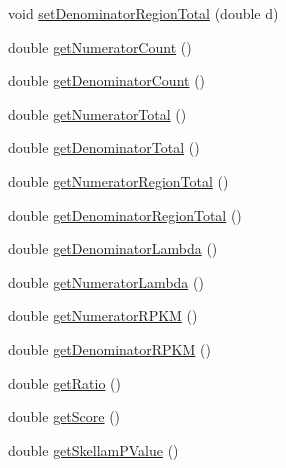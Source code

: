 \begin{DoxyCompactItemize}
\item 
void \hyperlink{classumms_1_1core_1_1model_1_1score_1_1_window_all_score_a290882f1dd93b974a0c4160f7722220d}{set\+Denominator\+Region\+Total} (double d)
\item 
double \hyperlink{classumms_1_1core_1_1model_1_1score_1_1_window_all_score_a87f4de8b66a065747c088ea070800a86}{get\+Numerator\+Count} ()
\item 
double \hyperlink{classumms_1_1core_1_1model_1_1score_1_1_window_all_score_a9ae2b2657a9333aadf08d70bbe92d35e}{get\+Denominator\+Count} ()
\item 
double \hyperlink{classumms_1_1core_1_1model_1_1score_1_1_window_all_score_a6961f90f44a7f5b9a1b9d3bb88f26ebc}{get\+Numerator\+Total} ()
\item 
double \hyperlink{classumms_1_1core_1_1model_1_1score_1_1_window_all_score_afa9588551cc4ea71a624a58ca02724ac}{get\+Denominator\+Total} ()
\item 
double \hyperlink{classumms_1_1core_1_1model_1_1score_1_1_window_all_score_aa84f99d749d254db6655f66a650f618a}{get\+Numerator\+Region\+Total} ()
\item 
double \hyperlink{classumms_1_1core_1_1model_1_1score_1_1_window_all_score_abea956161e9e1cba7c6e23d64ef8cd2e}{get\+Denominator\+Region\+Total} ()
\item 
double \hyperlink{classumms_1_1core_1_1model_1_1score_1_1_window_all_score_a7c40c0401bc3716b3925d55d406f494a}{get\+Denominator\+Lambda} ()
\item 
double \hyperlink{classumms_1_1core_1_1model_1_1score_1_1_window_all_score_aebf10de139ccc2bb6c5839758342290d}{get\+Numerator\+Lambda} ()
\item 
double \hyperlink{classumms_1_1core_1_1model_1_1score_1_1_window_all_score_a7727a0c2ed1fcfd74a7bf986a344c419}{get\+Numerator\+R\+P\+K\+M} ()
\item 
double \hyperlink{classumms_1_1core_1_1model_1_1score_1_1_window_all_score_ac3c013a76b2294982c6b2affdf809cd8}{get\+Denominator\+R\+P\+K\+M} ()
\item 
double \hyperlink{classumms_1_1core_1_1model_1_1score_1_1_window_all_score_a6486ae7c419b77fa62e91550bd87617b}{get\+Ratio} ()
\item 
double \hyperlink{classumms_1_1core_1_1model_1_1score_1_1_window_all_score_a43b3c23abd2ac3c3bd49691656048433}{get\+Score} ()
\item 
double \hyperlink{classumms_1_1core_1_1model_1_1score_1_1_window_all_score_ad917b97ffdb8a2f02f6122616c0de469}{get\+Skellam\+P\+Value} ()
\item 

\end{DoxyCompactItemize}
